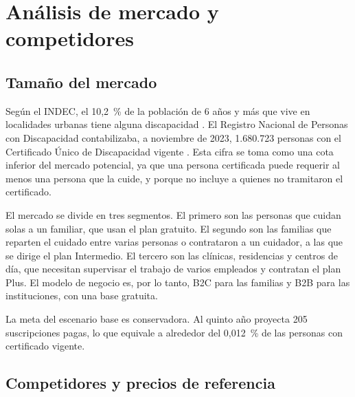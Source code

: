 \section{Análisis de mercado y competidores}

\subsection{Tamaño del mercado}

Según el INDEC, el 10,2~\% de la población de 6 años y más que vive en localidades urbanas tiene alguna discapacidad \citep{indec2018}. El Registro Nacional de Personas con Discapacidad contabilizaba, a noviembre de 2023, 1.680.723 personas con el Certificado Único de Discapacidad vigente \citep{andis2023}. Esta cifra se toma como una cota inferior del mercado potencial, ya que una persona certificada puede requerir al menos una persona que la cuide, y porque no incluye a quienes no tramitaron el certificado.

El mercado se divide en tres segmentos. El primero son las personas que cuidan solas a un familiar, que usan el plan gratuito. El segundo son las familias que reparten el cuidado entre varias personas o contrataron a un cuidador, a las que se dirige el plan Intermedio. El tercero son las clínicas, residencias y centros de día, que necesitan supervisar el trabajo de varios empleados y contratan el plan Plus. El modelo de negocio es, por lo tanto, B2C para las familias y B2B para las instituciones, con una base gratuita.

La meta del escenario base es conservadora. Al quinto año proyecta 205 suscripciones pagas, lo que equivale a alrededor del 0,012~\% de las personas con certificado vigente.

\subsection{Competidores y precios de referencia}

